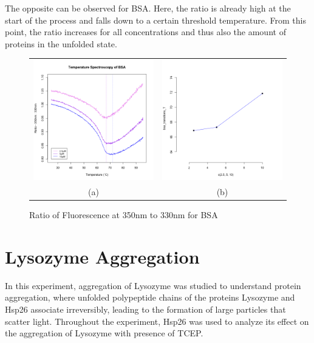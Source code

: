 \documentclass[a4paper,11pt]{article}
\begin{document}
            The opposite can be observed for BSA. Here, the ratio is already high at the start of 
            the process and falls down to a certain threshold temperature. From this point, the ratio 
            increases for all concentrations and thus also the amount of proteins in the unfolded state.
            \begin{figure}[H]
                \centering
                \begin{tabular}{cc}
                    \includegraphics[width=200px]{../resources/unfolding_BSA_ratio.png} &
                    \includegraphics[width=200px]{../resources/unfolding_BSA_tempVconc.png} \\
                    (a) & (b)\\
                \end{tabular}
                \caption{Ratio of Fluorescence at 350nm to 330nm for BSA}
                \label{fig:bsa_ratio}
            \end{figure}
    \pagebreak
    
    \section{Lysozyme Aggregation}
        In this experiment, aggregation of Lysozyme was studied to understand protein aggregation, 
        where unfolded polypeptide chains of the proteins Lysozyme and Hsp26 associate irreversibly, 
        leading to the formation of large particles that scatter light. 
        Throughout the experiment, Hsp26 was used to analyze its effect on the aggregation of 
        Lysozyme with presence of TCEP.
        
\end{document}
